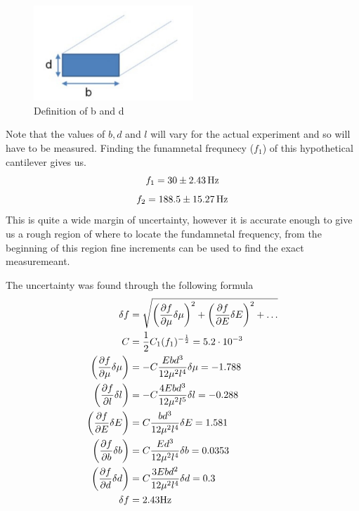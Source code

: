 \documentclass{article}
\begin{document}
\begin{figure}[h]
    \centering
    \captionsetup{justification=centering}
    \includegraphics[width=6cm]{bd.jpg}
    \caption{Definition of b and d \label{bd}}
\end{figure}

Note that the values of $b, d$ and $l$ will vary for the actual experiment and so will have to be measured.
Finding the funamnetal frequnecy ($f_1$) of this hypothetical cantilever gives us.
$$f_1 = 30 \pm 2.43\text{\,Hz} $$
$$f_2 = 188.5 \pm 15.27\text{\,Hz}$$
This is quite a wide margin of uncertainty, however it is accurate enough to give us a rough region of where to locate
the fundamnetal frequency, from the beginning of this region fine increments can be used to find the exact measuremeant.

The uncertainty was found through the following formula
\begin{align*}
    \delta f &= \sqrt{\left(\pdv{f}{\mu}\delta\mu\right)^2 + \left(\pdv{f}{E}\delta E\right)^2 + \ldots}\\
    C &= \frac{1}{2}C_1(f_1)^{-\frac{1}{2}} = 5.2 \cdot 10^{-3}\\
    \left(\pdv{f}{\mu}\delta\mu\right) &= -C \frac{Ebd^3}{12\mu^2l^4}\delta\mu = -1.788\\
    \left(\pdv{f}{l}\delta l\right) &= -C \frac{4Ebd^3}{12\mu^2l^5}\delta l = -0.288\\
    \left(\pdv{f}{E}\delta E\right) &= C \frac{bd^3}{12 \mu^2l^4}\delta E = 1.581\\
    \left(\pdv{f}{b}\delta b\right) &= C \frac{Ed^3}{12\mu^2l^4}\delta b = 0.0353\\
    \left(\pdv{f}{d}\delta d\right) &= C \frac{3Ebd^2}{12\mu^2l^4}\delta d = 0.3\\
    \delta f &= 2.43 \text{Hz} 
\end{align*} 
\end{document}
